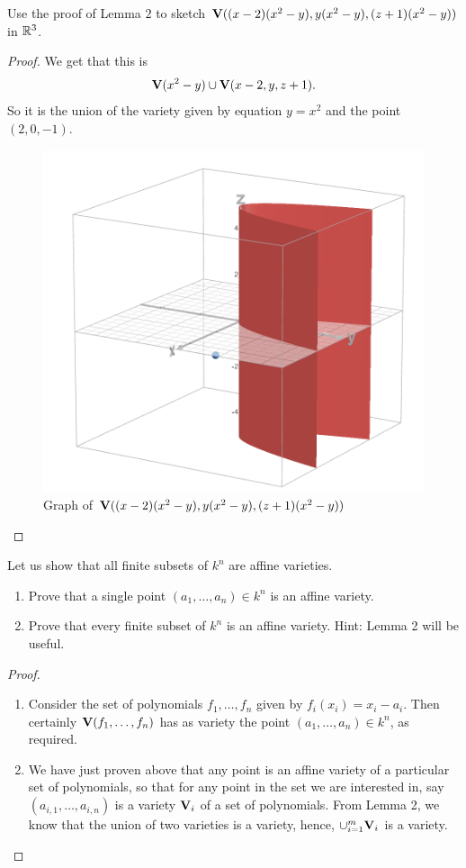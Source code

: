 \begin{exercise}{5}
Use the proof of Lemma $2$ to sketch $\mathbf{V}( (x-2)(x^2 - y), y(x^2 - y), (z+1)(x^2-y))$ in $\mathbb{R}^3$.
\end{exercise}
\begin{proof}
    We get that this is
    \begin{align*}
        \mathbf{V}(x^2 - y)\cup \mathbf{V}(x-2, y, z+1).
    \end{align*}
    So it is the union of the variety given by equation $y=x^2$ and the point $(2,0,-1)$.
    \begin{figure}
        \centering
        \includegraphics[width=0.5\linewidth]{cox-little-oshea/ch1/assets/sec1-2-ex5.png}
            \caption{Graph of $\mathbf{V}( (x-2)(x^2 - y), y(x^2 - y), (z+1)(x^2-y))$}
            \label{fig:sec1-2-ex5}
    \end{figure}
\end{proof}

\begin{exercise}{6}
Let us show that all finite subsets of $k^n$ are affine varieties.
\begin{enumerate}
    \item Prove that a single point $(a_1,\dots,a_n)\in k^n$ is an affine variety.
    \item Prove that every finite subset of $k^n$ is an affine variety. 
    Hint: Lemma 2 will be useful.
\end{enumerate}
\end{exercise}
\begin{proof}
 \begin{enumerate}
     \item Consider the set of polynomials $f_1,\dots,f_n$ given by $f_i(x_i)=x_i-a_i$. 
     Then certainly $\mathbf{V}(f_1,\dots,f_n)$ has as variety the point $(a_1,\dots,a_n)\in k^n$, as required.
     \item We have just proven above that any point is an affine variety of a particular set of polynomials, so that for any point in the set we are interested in, say $(a_{i,1},\dots,a_{i,n})$ is a variety $\mathbf{V}_i$ of a set of polynomials. 
     From Lemma 2, we know that the union of two varieties is a variety, hence, $\cup_{i=1}^{m}\mathbf{V}_i$ is a variety.
 \end{enumerate}
\end{proof}

